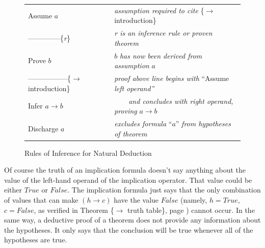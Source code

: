 \begin{figure}
\begin{center}
\begin{tabular}{ll}
Assume $a$                                      & \emph{assumption required to cite} \{$\rightarrow$ introduction\}     \\
--------------\{\emph{r}\}                      & \emph{r is an inference rule or proven theorem}                       \\
Prove $b$                                       & $b$ \emph{has now been derived from assumption} $a$                   \\
-----------------\{$\rightarrow$ introduction\} & \emph{proof above line begins with} ``Assume \emph{left operand''}    \\
Infer $a \rightarrow b$                         & ~~~~\emph{and concludes with right operand, proving} $a \rightarrow b$\\
Discharge $a$                                   & \emph{excludes formula} ``$a$'' \emph{from hypotheses of theorem}     \\
\end{tabular}
\end{center}
\caption{Rules of Inference for Natural Deduction}
\label{fig-02-deduction-rules}
\end{figure}

Of course the truth of an implication formula doesn't
say anything about the value of the
left-hand operand of the implication operator.
That value could be either $True$ or $False$.
The implication formula just says that
the only combination of values that can make
$(h \rightarrow c)$ have the value $False$
(namely, $h = True$, $c = False$, as verified in
Theorem \{$\rightarrow$ truth table\},
page \pageref{implication-truth-table}) cannot occur.
In the same way, a deductive proof of a theorem
does not provide any information about the hypotheses.
It only says that the conclusion will be true
whenever all of the hypotheses are true.

